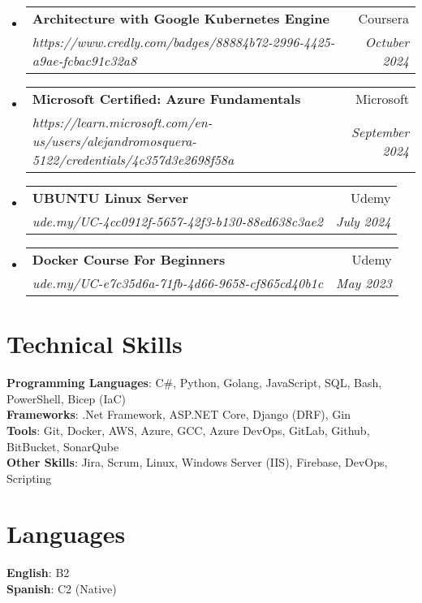 \documentclass[letterpaper,11pt]{article}
\makeatletter
\newcommand{\resumeSubheading}[4]{
  \vspace{-2pt}\item
    \begin{tabular*}{0.97\textwidth}[t]{l@{\extracolsep{\fill}}r}
      \textbf{#1} & #2 \\
      \textit{\small#3} & \textit{\small #4} \\
    \end{tabular*}\vspace{-7pt}
}
\newcommand{\resumeSubHeadingListStart}{\begin{itemize}[leftmargin=0.15in, label={}]}
\newcommand{\resumeSubHeadingListEnd}{\end{itemize}}
\makeatother
\begin{document}
  \resumeSubHeadingListStart
    \resumeSubheading
      {Architecture with Google Kubernetes Engine}{Coursera}
      {https://www.credly.com/badges/88884b72-2996-4425-a9ae-fcbac91c32a8}{Octuber 2024}
  \resumeSubHeadingListEnd

  \resumeSubHeadingListStart
    \resumeSubheading
      {Microsoft Certified: Azure Fundamentals}{Microsoft}
      {https://learn.microsoft.com/en-us/users/alejandromosquera-5122/credentials/4c357d3e2698f58a}{September 2024}
  \resumeSubHeadingListEnd
  
  \resumeSubHeadingListStart
    \resumeSubheading
      {UBUNTU Linux Server}{Udemy}
      {ude.my/UC-4cc0912f-5657-42f3-b130-88ed638c3ae2}{July 2024}
  \resumeSubHeadingListEnd

  \resumeSubHeadingListStart
    \resumeSubheading
      {Docker Course For Beginners}{Udemy}
      {ude.my/UC-e7c35d6a-71fb-4d66-9658-cf865cd40b1c}{May 2023}
  \resumeSubHeadingListEnd



%

\section{Technical Skills}
 \begin{itemize}[leftmargin=0.15in, label={}]
    \small{\item{
     \textbf{Programming Languages}{: C\#, Python, Golang, JavaScript, SQL, Bash, PowerShell, Bicep (IaC)} \\
     \textbf{Frameworks}{: .Net Framework, ASP.NET Core, Django (DRF), Gin} \\
     \textbf{Tools}{: Git, Docker, AWS, Azure, GCC, Azure DevOps, GitLab, Github, BitBucket, SonarQube} \\
     \textbf{Other Skills}{: Jira, Scrum, Linux, Windows Server (IIS), Firebase, DevOps, Scripting}
    }}
 \end{itemize}

\section{Languages}
 \begin{itemize}[leftmargin=0.15in, label={}]
    \small{\item{
     \textbf{English}{: B2} \\
     \textbf{Spanish}{: C2 (Native)} \\
    }}
 \end{itemize}

\end{document}
